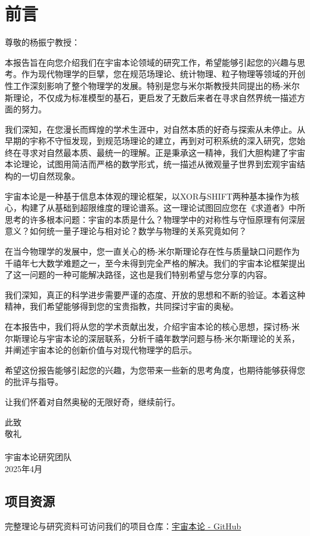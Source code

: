 \chapter{前言}

尊敬的杨振宁教授：

本报告旨在向您介绍我们在宇宙本论领域的研究工作，希望能够引起您的兴趣与思考。作为现代物理学的巨擘，您在规范场理论、统计物理、粒子物理等领域的开创性工作深刻影响了整个物理学的发展。特别是您与米尔斯教授共同提出的杨-米尔斯理论，不仅成为标准模型的基石，更启发了无数后来者在寻求自然界统一描述方面的努力。

我们深知，在您漫长而辉煌的学术生涯中，对自然本质的好奇与探索从未停止。从早期的宇称不守恒发现，到规范场理论的建立，再到对可积系统的深入研究，您始终在寻求对自然最本质、最统一的理解。正是秉承这一精神，我们大胆构建了宇宙本论理论，试图用简洁而严格的数学形式，统一描述从微观量子世界到宏观宇宙结构的一切自然现象。

宇宙本论是一种基于信息本体观的理论框架，以XOR与SHIFT两种基本操作为核心，构建了从基础到超限维度的理论谱系。这一理论试图回应您在《求道者》中所思考的许多根本问题：宇宙的本质是什么？物理学中的对称性与守恒原理有何深层意义？如何统一量子理论与相对论？数学与物理的关系究竟如何？

在当今物理学的发展中，您一直关心的杨-米尔斯理论存在性与质量缺口问题作为千禧年七大数学难题之一，至今未得到完全严格的解决。我们的宇宙本论框架提出了这一问题的一种可能解决路径，这也是我们特别希望与您分享的内容。

我们深知，真正的科学进步需要严谨的态度、开放的思想和不断的验证。本着这种精神，我们希望能够得到您的宝贵指教，共同探讨宇宙的奥秘。

在本报告中，我们将从您的学术贡献出发，介绍宇宙本论的核心思想，探讨杨-米尔斯理论与宇宙本论的深层联系，分析千禧年数学问题与杨-米尔斯理论的关系，并阐述宇宙本论的创新价值与对现代物理学的启示。

希望这份报告能够引起您的兴趣，为您带来一些新的思考角度，也期待能够获得您的批评与指导。

让我们怀着对自然奥秘的无限好奇，继续前行。

\begin{flushright}
此致\\
敬礼\\
~\\
宇宙本论研究团队\\
2025年4月
\end{flushright}

\section*{项目资源}

完整理论与研究资料可访问我们的项目仓库：\href{https://github.com/loning/universe/tree/cosmos/}{宇宙本论 - GitHub} 
